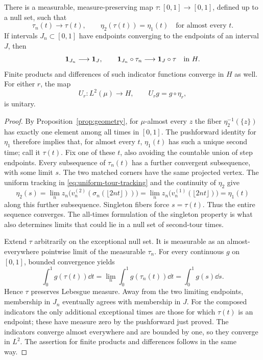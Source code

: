 \begin{lemma}\label{lem:tour-order}
There is a measurable, measure-preserving map \(\tau:[0,1]\to[0,1]\),
defined up to a null set, such that
\[
 \tau_n(t)\longrightarrow\tau(t),\qquad
 \eta_2(\tau(t))=\eta_1(t)
 \quad\text{for almost every }t.
\]
If intervals \(J_n\subset[0,1]\) have endpoints converging to the endpoints
of an interval \(J\), then
\[
 \mathbf 1_{J_n}\longrightarrow\mathbf 1_J,\qquad
 \mathbf 1_{J_n}\circ\tau_n\longrightarrow\mathbf 1_J\circ\tau
 \quad\text{in }H.
\]
Finite products and differences of such indicator functions converge in
\(H\) as well.  For either \(r\), the map
\[
 U_r:L^2(\mu)\longrightarrow H,\qquad U_rg=g\circ\eta_r,
\]
is unitary.
\end{lemma}

\begin{proof}
By Proposition~\ref{prop:geometry}, for \(\mu\)-almost every \(z\) the
fiber \(\eta_2^{-1}(\{z\})\) has exactly one element among all times in
\([0,1]\).  The pushforward identity for \(\eta_1\) therefore implies that,
for almost every \(t\), \(\eta_1(t)\) has such a unique second time; call it
\(\tau(t)\).  Fix one of these \(t\), also avoiding the countable union of
step endpoints.  Every subsequence of \(\tau_n(t)\) has a further
convergent subsequence, with some limit \(s\).  The two matched corners have
the same projected vertex.  The uniform tracking in
\eqref{eq:uniform-tour-tracking} and the continuity of \(\eta_2\) give
\[
 \eta_2(s)=\lim_n z_n\bigl(v_n^{(2)}(\sigma_n(\lfloor2nt\rfloor))\bigr)
 =\lim_n z_n\bigl(v_n^{(1)}(\lfloor2nt\rfloor)\bigr)=\eta_1(t)
\]
along this further subsequence.  Singleton fibers force \(s=\tau(t)\).
Thus the entire sequence converges.  The all-times formulation of the
singleton property is what also determines limits that could lie in a null
set of second-tour times.

Extend \(\tau\) arbitrarily on the exceptional null set.  It is measurable
as an almost-everywhere pointwise limit of the measurable \(\tau_n\).  For
every continuous \(g\) on \([0,1]\), bounded convergence yields
\[
 \int_0^1g(\tau(t))\dd t
 =\lim_n\int_0^1g(\tau_n(t))\dd t=\int_0^1g(s)\dd s.
\]
Hence \(\tau\) preserves Lebesgue measure.  Away from the two limiting
endpoints, membership in \(J_n\) eventually agrees with membership in
\(J\).  For the composed indicators the only additional exceptional times
are those for which \(\tau(t)\) is an endpoint; these have measure zero by
the pushforward just proved.  The indicators converge almost everywhere
and are bounded by one, so they converge in \(L^2\).  The assertion for
finite products and differences follows in the same way.


\end{proof}
